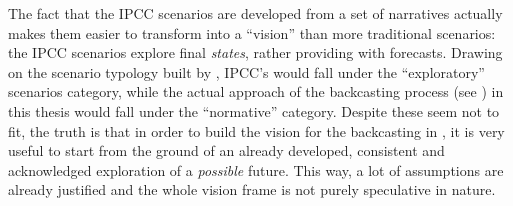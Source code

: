 The fact that the IPCC scenarios are developed from a set of narratives actually makes them easier to transform into a ``vision'' than more traditional scenarios: the IPCC scenarios explore final \emph{states}, rather providing with forecasts. Drawing on the scenario typology built by \textcite{boerjeson2006_Scenariotypestechniques}, IPCC's would fall under the ``exploratory'' scenarios category, while the actual approach of the backcasting process (see ) in this thesis would fall under the ``normative'' category. Despite these seem not to fit, the truth is that in order to build the vision for the backcasting in , it is very useful to start from the ground of an already developed, consistent and acknowledged exploration of a \emph{possible} future. This way, a lot of assumptions are already justified and the whole vision frame is not purely speculative in nature.